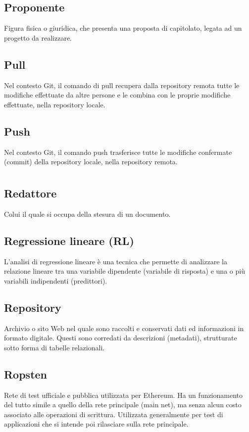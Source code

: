 	\subsection*{Proponente}
	Figura fisica o giuridica, che presenta una proposta di capitolato, legata ad un progetto da realizzare.
	\subsection*{Pull}
	Nel contesto Git, il comando di pull recupera dalla repository remota tutte le modifiche effettuate da altre persone e le combina con le proprie modifiche effettuate, nella repository locale.
	\subsection*{Push}
	Nel contesto Git, il comando push trasferisce tutte le modifiche confermate (commit) della repository locale, nella repository remota.
\pagebreak
\section[R]{}
	\subsection*{Redattore}
	Colui il quale si occupa della stesura di un documento.
	\subsection*{Regressione lineare (RL)}
	L'analisi di regressione lineare è una tecnica che permette di analizzare la relazione lineare tra una variabile dipendente (variabile di risposta) e una o più variabili indipendenti (predittori).
	\subsection*{Repository}
	Archivio o sito Web nel quale sono raccolti e conservati dati ed informazioni in formato digitale. Questi sono corredati da descrizioni (metadati), strutturate sotto forma di tabelle relazionali.
	\subsection*{Ropsten}
	Rete di test ufficiale e pubblica utilizzata per Ethereum. Ha un funzionamento del tutto simile a quello della rete principale (main net), ma senza alcun costo associato alle operazioni di scrittura. Utilizzata generalmente per test di applicazioni che si intende poi rilasciare sulla rete principale.
\pagebreak
